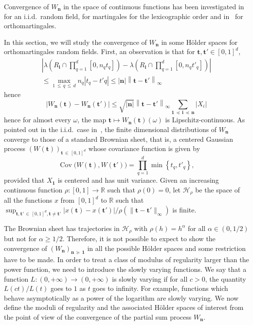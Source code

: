 \documentclass[10pt]{amsart}
\theoremstyle{definition}\newtheorem{defi}[theo]{Definition}\newtheorem{rema}[theo]{Remark}\newtheorem{exam}[theo]{Example}\newtheorem{exem}[theo]{Example}\newtheorem{nota}[theo]{Notation}
\newcommand{\Hca}{\mathcal{H}}
\newcommand\R{\mathbb{R}}
\newcommand\abs[1]{|#1|}
\newcommand{\pr}[1]{(#1)}
\newcommand{\norm}[1]{\lVert #1\rVert}
\newcommand{\gr}[1]{\bm{#1}}
\newcommand{\gri}{\bm{i}}
\newcommand{\grn}{\bm{n}}
\newcommand{\grt}{\bm{t}}
\newcommand{\imd}{\preccurlyeq}
\newcommand{\smd}{\succcurlyeq }
\begin{document}
Convergence of $W_{\grn}$ in the space of continuous functions has been investigated in~\cite{MR0246359} for an i.i.d.\ random field, \cite{MR1875665} for martingales for the lexicographic order and in~\cite{MR3427925,MR3913270} for orthomartingales.

In this section, we will study the convergence of $W_{\grn}$ in some H\"older spaces for orthomartingales random fields. First, an observation is that for $\grt,\gr{t'}\in [0,1]^d$,
\begin{multline}
\left| \lambda\left(R_{\gri}\cap \prod_{q=1}^d [0,n_qt_q]\right)- \lambda\left(R_{\gri}\cap \prod_{q=1}^d [0,n_qt'_q]\right)\right|\\
\leq \max_{1\,\leq\,q\,\leq\,d}n_q
\left|t_q-t'q\right|\leq \left|\grn\right|\left\|\grt-\gr{t'}\right\|_\infty
\end{multline}
hence
\begin{equation}
\left|W_{\grn}\left(\grt\right)-W_{\grn}\left(\gr{t'}\right)\right|
\leq \sqrt{\left|\grn\right|} \left\|\grt-\gr{t'}\right\|_\infty
\sum_{\gr{1}\,\imd\,\gri\,\imd\,\grn}\left|X_i\right|
\end{equation}
hence for almost every $\omega$, the map $\grt\mapsto W_{\grn}\pr{\grt}\pr{\omega}$ is Lipschitz-continuous. As pointed out in the i.i.d.\ case in~\cite{MR0246359}, the finite dimensional distributions of $W_{\grn}$ converge to those of a standard Brownian sheet, that is, a centered Gaussian process $\pr{W\pr{\grt}}_{\grt\,
\in\,[0,1]^d}$ whose covariance function is given by
\begin{equation}
\operatorname{Cov}\big(W\pr{\grt},W\pr{\gr{t'}}\big) =\prod_{q=1}^d\min\left\{t_q,t'_q\right\},
\end{equation}
provided that $X_{\gr{1}}$ is centered and has unit variance. Given an increasing continuous function $\rho\colon [0,1]\to\R$ such that $\rho\pr{0}=0$, let $\Hca_\rho$ be the space of all the functions $x$ from $[0,1]^d$ to $\R$ such that $\sup_{\grt,\gr{t'}\,\in\,[0,1]^d,
\grt\neq\gr{t'}}\abs{x\pr{\grt}-x\pr{\gr{t'}}}/
\rho\pr{\norm{\grt-\gr{t'}}_\infty }$ is finite.

The Brownian sheet has trajectories in $\Hca_\rho$ with $\rho\pr{h} =h^\alpha$ for all $\alpha \in\pr{0,1/2}$ but not for $\alpha\geq 1/2$. Therefore, it is not possible to expect to show the convergence of $\pr{W_{\grn}}_{\grn\,\smd\,\gr{1}}$ in all the possible H\"older spaces and some restriction have to be made. In order to treat a class of modulus of regularity larger than the power function, we need to introduce the slowly varying functions. We say that a function $L\colon \pr{0,+\infty}\to \pr{0,+\infty}$ is slowly varying if for all $c>0$, the quantity $L\pr{ct}/L\pr{t}$ goes to $1$ as $t$ goes to infinity. For example, functions which behave asymptotically as a power of the logarithm are slowly varying. We now define the moduli of regularity and the associated H\"older spaces of interest from the point of view of the convergence of the partial sum process $W_{\grn}$.
\end{document}
